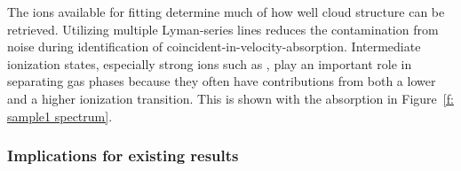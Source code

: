 \documentclass[fleqn,usenatbib]{mnras}
\begin{document}

The ions available for fitting determine much of how well cloud structure can be retrieved.
Utilizing multiple Lyman-series lines reduces the contamination from noise during identification of coincident-in-velocity-absorption.
Intermediate ionization states, especially strong ions such as , play an important role in separating gas phases because they often have contributions from both a lower and a higher ionization transition.
This is shown with the  absorption in Figure~\ref{f: sample1 spectrum}.

\subsubsection{Implications for existing results}
\label{s: discussion -- cloud structure -- implications}
\end{document}
